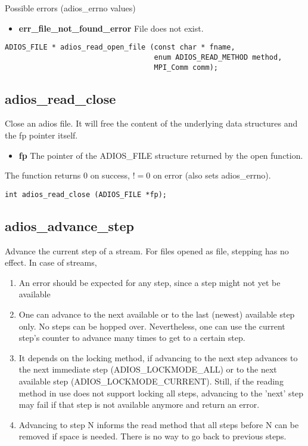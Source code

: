 Possible errors (adios\_errno values)
\begin{itemize}
\item{\bf err\_file\_not\_found\_error}  File does not exist. 
\end{itemize}

\begin{lstlisting}[alsolanguage=C]
ADIOS_FILE * adios_read_open_file (const char * fname, 
                                   enum ADIOS_READ_METHOD method,
                                   MPI_Comm comm);
\end{lstlisting}

\subsection{adios\_read\_close}
Close an adios file. It will free the content of the underlying data structures and the fp pointer itself.

\begin{itemize}
\item{\bf fp}    The pointer of the ADIOS\_FILE structure returned by the open function.
\end{itemize}

The function returns 0 on success, $!=0$ on error (also sets adios\_errno).

\begin{lstlisting}[alsolanguage=C]
int adios_read_close (ADIOS_FILE *fp);

\end{lstlisting}

\subsection{adios\_advance\_step}
Advance the current step of a stream. For files opened as file, stepping has no effect.
In case of streams, 

\begin{enumerate}
\item An error should be expected for any step, since a step might not yet be available 

\item One can advance to the next available or to the last (newest) available step only. 
No steps can be hopped over. Nevertheless, one can use the current step's counter to advance 
many times to get to a certain step. 

\item It depends on the locking method, if advancing to the next step advances to the next
immediate step (ADIOS\_LOCKMODE\_ALL) or to the next available step (ADIOS\_LOCKMODE\_CURRENT). 
Still, if the reading method in use does not support locking all steps, advancing to the 'next' step may fail 
if that step is not available anymore and return an error. 

\item Advancing to step N informs the read method that all steps 
before N can be removed if space is needed. There is no way to go back to previous steps.
\end{enumerate}


